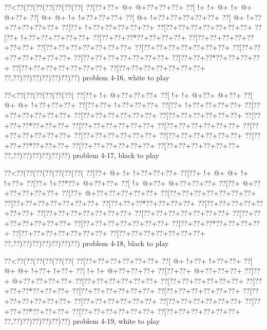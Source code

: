 \vbox{\vbox{\goo
\0??<\0??(\0??(\0??(\0??(\0??(\0??(\0??(
\0??[\0??+\0??+\- @+\- @+\0??+\0??+\0??+
\0??[\- !+\- !+\- @+\- !+\- @+\- @+\0??+
\0??[\- @+\- @+\- !+\- !+\0??+\0??+\0??+
\0??[\- @+\- !+\0??+\0??+\0??+\0??+\0??+
\0??[\- @+\- !+\0??+\0??+\0??+\0??+\0??+
\0??[\0??+\- !+\0??+\0??+\0??+\0??+\0??+
\0??[\0??+\0??+\0??+\0??+\0??+\0??+\0??+
\0??[\0??+\- !+\0??+\0??+\0??+\0??+\0??+
\0??[\0??+\0??+\0??*\0??+\0??+\0??+\0??+
\0??[\0??+\0??+\0??+\0??+\0??+\0??+\0??+
\0??[\0??+\0??+\0??+\0??+\0??+\0??+\0??+
\0??[\0??+\0??+\0??+\0??+\0??+\0??+\0??+
\0??[\0??+\0??+\0??+\0??+\0??+\0??+\0??+
\0??[\0??+\0??+\0??+\0??+\0??+\0??+\0??+
\0??[\0??+\0??+\0??*\0??+\0??+\0??+\0??+
\0??[\0??+\0??+\0??+\0??+\0??+\0??+\0??+
\0??[\0??+\0??+\0??+\0??+\0??+\0??+\0??+
\0??,\0??)\0??)\0??)\0??)\0??)\0??)\0??)
}
\hfil problem 4-16, white to play\hfil\break
}

\vbox{\vbox{\goo
\0??<\0??(\0??(\0??(\0??(\0??(\0??(
\0??[\0??+\- !+\- @+\0??+\0??+\0??+
\0??[\- !+\- !+\- @+\0??+\- @+\0??+
\0??[\- @+\- @+\- !+\0??+\0??+\0??+
\0??[\0??+\0??+\- !+\0??+\0??+\0??+
\0??[\0??+\- !+\0??+\0??+\0??+\0??+
\0??[\0??+\0??+\0??+\0??+\0??+\0??+
\0??[\0??+\0??+\0??+\0??+\0??+\0??+
\0??[\0??+\0??+\0??+\0??+\0??+\0??+
\0??[\0??+\0??+\0??*\0??+\0??+\0??+
\0??[\0??+\0??+\0??+\0??+\0??+\0??+
\0??[\0??+\0??+\0??+\0??+\0??+\0??+
\0??[\0??+\0??+\0??+\0??+\0??+\0??+
\0??[\0??+\0??+\0??+\0??+\0??+\0??+
\0??[\0??+\0??+\0??+\0??+\0??+\0??+
\0??[\0??+\0??+\0??*\0??+\0??+\0??+
\0??[\0??+\0??+\0??+\0??+\0??+\0??+
\0??[\0??+\0??+\0??+\0??+\0??+\0??+
\0??,\0??)\0??)\0??)\0??)\0??)\0??)
}
\hfil problem 4-17, black to play\hfil\break
}

\vbox{\vbox{\goo
\0??<\0??(\0??(\0??(\0??(\0??(\0??(\0??(
\0??[\0??+\- @+\- !+\- !+\0??+\0??+\0??+
\0??[\0??+\- !+\- @+\- @+\- !+\- !+\0??+
\0??[\0??+\- !+\0??*\0??+\- @+\0??+\0??+
\0??[\- !+\- @+\0??+\- @+\0??+\0??+\0??+
\0??[\0??+\- @+\0??+\0??+\0??+\0??+\0??+
\0??[\0??+\- @+\0??+\0??+\0??+\0??+\0??+
\0??[\0??+\0??+\0??+\0??+\0??+\0??+\0??+
\0??[\0??+\0??+\0??+\0??+\0??+\0??+\0??+
\0??[\0??+\0??+\0??*\0??+\0??+\0??+\0??+
\0??[\0??+\0??+\0??+\0??+\0??+\0??+\0??+
\0??[\0??+\0??+\0??+\0??+\0??+\0??+\0??+
\0??[\0??+\0??+\0??+\0??+\0??+\0??+\0??+
\0??[\0??+\0??+\0??+\0??+\0??+\0??+\0??+
\0??[\0??+\0??+\0??+\0??+\0??+\0??+\0??+
\0??[\0??+\0??+\0??*\0??+\0??+\0??+\0??+
\0??[\0??+\0??+\0??+\0??+\0??+\0??+\0??+
\0??[\0??+\0??+\0??+\0??+\0??+\0??+\0??+
\0??,\0??)\0??)\0??)\0??)\0??)\0??)\0??)
}
\hfil problem 4-18, black to play\hfil\break
}

\vbox{\vbox{\goo
\0??<\0??(\0??(\0??(\0??(\0??(\0??(
\0??[\0??+\0??+\0??+\0??+\0??+\0??+
\0??[\- @+\- !+\0??+\- !+\0??+\0??+
\0??[\- @+\- @+\- !+\0??+\- !+\0??+
\0??[\- !+\- !+\- @+\0??+\0??+\0??+
\0??[\0??+\0??+\- @+\0??+\0??+\0??+
\0??[\0??+\- @+\0??+\0??+\0??+\0??+
\0??[\0??+\0??+\0??+\0??+\0??+\0??+
\0??[\0??+\0??+\0??+\0??+\0??+\0??+
\0??[\0??+\0??+\0??*\0??+\0??+\0??+
\0??[\0??+\0??+\0??+\0??+\0??+\0??+
\0??[\0??+\0??+\0??+\0??+\0??+\0??+
\0??[\0??+\0??+\0??+\0??+\0??+\0??+
\0??[\0??+\0??+\0??+\0??+\0??+\0??+
\0??[\0??+\0??+\0??+\0??+\0??+\0??+
\0??[\0??+\0??+\0??*\0??+\0??+\0??+
\0??[\0??+\0??+\0??+\0??+\0??+\0??+
\0??[\0??+\0??+\0??+\0??+\0??+\0??+
\0??,\0??)\0??)\0??)\0??)\0??)\0??)
}
\hfil problem 4-19, white to play\hfil\break
}

